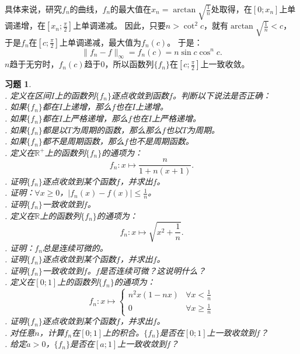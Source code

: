 \documentclass[12pt,UTF8]{ctexbook}
\theoremstyle{definition}
\theoremstyle{plain}
\newtheorem{xt}{习题}[section]
\begin{document}
具体来说，研究$f_n$的曲线，$f_n$的最大值在$x_n = \arctan{\sqrt{\frac{1}{n}}}$处取得，在$[0;x_n]$上单调递增，在$\left[x_n;\frac{\pi}{2}\right]$上单调递减。
因此，只要$n>\cot^2{c}$，就有$\arctan{\sqrt{\frac{1}{n}}} < c$，于是$f_n$在$\left[c;\frac{\pi}{2}\right]$上单调递减，最大值为$f_n(c)$。
于是：
$$ \| f_n - f\|_{\infty} = f_n(c) = n\sin{c}\cos^n{c}.$$
$n$趋于无穷时，$f_n(c)$趋于$0$，所以函数列$\{f_n\}$在$\left[c;\frac{\pi}{2}\right]$上一致收敛。

\begin{xt}
    \mbox{} \\
    . 定义在区间$I$上的函数列$\{f_n\}$逐点收敛到函数$f$。判断以下说法是否正确：\\
    . 如果$\{f_n\}$都在$I$上递增，那么$f$也在$I$上递增。\\
    . 如果$\{f_n\}$都在$I$上严格递增，那么$f$也在$I$上严格递增。\\
    . 如果$\{f_n\}$都是以$T$为周期的函数，那么那么$f$也以$T$为周期。\\
    . 如果$\{f_n\}$都不是周期函数，那么$f$也不是周期函数。\\
    . 定义在$\mathbb{R}^+$上的函数列$\{f_n\}$的通项为：
    $$ f_n: x\mapsto \frac{n}{1 + n( x + 1)}. $$
    . 证明$\{f_n\}$逐点收敛到某个函数$f$，并求出$f$。\\
    . 证明：$\forall x \geqslant 0$，$|f_n(x) - f(x)| \leqslant \frac{1}{n}$。\\
    . 证明$\{f_n\}$一致收敛到$f$。\\
    . 定义在$\mathbb{R}$上的函数列$\{f_n\}$的通项为：
    $$ f_n: x\mapsto \sqrt{x^2 + \frac{1}{n}}. $$
    . 证明：$f_n$总是连续可微的。\\
    . 证明$\{f_n\}$逐点收敛到某个函数$f$，并求出$f$。\\
    . 证明$\{f_n\}$一致收敛到$f$。$f$是否连续可微？这说明什么？\\
    . 定义在$[0;1]$上的函数列$\{f_n\}$的通项为：
    $$ f_n: x\mapsto \begin{cases}
        n^2x(1 - nx) & \forall x < \frac{1}{n} \\
        0 & \forall x \geqslant \frac{1}{n}
    \end{cases} $$
    . 证明$\{f_n\}$逐点收敛到某个函数$f$，并求出$f$。\\
    . 对任意$n$，计算$f_n$在$[0;1]$上的积合。$\{f_n\}$是否在$[0;1]$上一致收敛到$f$？\\
    . 给定$a>0$，$\{f_n\}$是否在$[a;1]$上一致收敛到$f$？
\end{xt}
\end{document}
